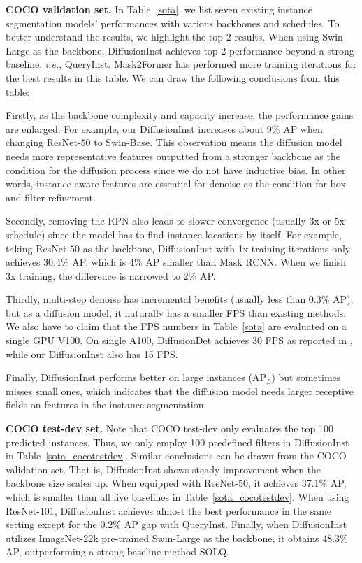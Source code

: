 \documentclass{article}
\begin{document}
\noindent\textbf{COCO validation set.} In Table~\ref{sota}, we list seven existing instance segmentation models' performances with various backbones and schedules. To better understand the results, we highlight the top 2 results. When using Swin-Large as the backbone, DiffusionInst achieves top 2 performance beyond a strong baseline, \emph{i.e.}, QueryInst. Mask2Former has performed more training iterations for the best results in this table. We can draw the following conclusions from this table: 

Firstly, as the backbone complexity and capacity increase, the performance gains are enlarged. For example, our DiffusionInst increases about 9\% AP when changing ResNet-$50$ to Swin-Base. This observation means the diffusion model needs more representative features outputted from a stronger backbone as the condition for the diffusion process since we do not have inductive bias. In other words, instance-aware features are essential for denoise as the condition for box and filter refinement. 

Secondly, removing the RPN also leads to slower convergence (usually 3x or 5x schedule) since the model has to find instance locations by itself. For example, taking ResNet-$50$ as the backbone, DiffusionInst with 1x training iterations only achieves 30.4\% AP, which is 4\% AP smaller than Mask RCNN. When we finish 3x training, the difference is narrowed to 2\% AP.

Thirdly, multi-step denoise has incremental benefits (usually less than 0.3\% AP), but as a diffusion model, it naturally has a smaller FPS than existing methods. We also have to claim that the FPS numbers in Table~\ref{sota} are evaluated on a single GPU V100. On single A100, DiffusionDet achieves 30 FPS as reported in \cite{DiffusionDet}, while our DiffusionInst also has 15 FPS. 

Finally, DiffusionInst performs better on large instances (AP$_{L}$) but sometimes misses small ones, which indicates that the diffusion model needs larger receptive fields on features in the instance segmentation.

\noindent\textbf{COCO test-dev set.} 
Note that COCO test-dev only evaluates the top 100 predicted instances. Thus, we only employ 100 predefined filters in DiffusionInst in Table~\ref{sota_cocotestdev}. Similar conclusions can be drawn from the COCO validation set. That is, DiffusionInst shows steady improvement when the backbone size scales up. When equipped with ResNet-$50$, it achieves 37.1\% AP, which is smaller than all five baselines in Table~\ref{sota_cocotestdev}. When using ResNet-$101$, DiffusionInst achieves almost the best performance in the same setting except for the 0.2\% AP gap with QueryInst. Finally, when DiffusionInst utilizes ImageNet-22k pre-trained Swin-Large as the backbone, it obtains 48.3\% AP, outperforming a strong baseline method SOLQ.
\end{document}
